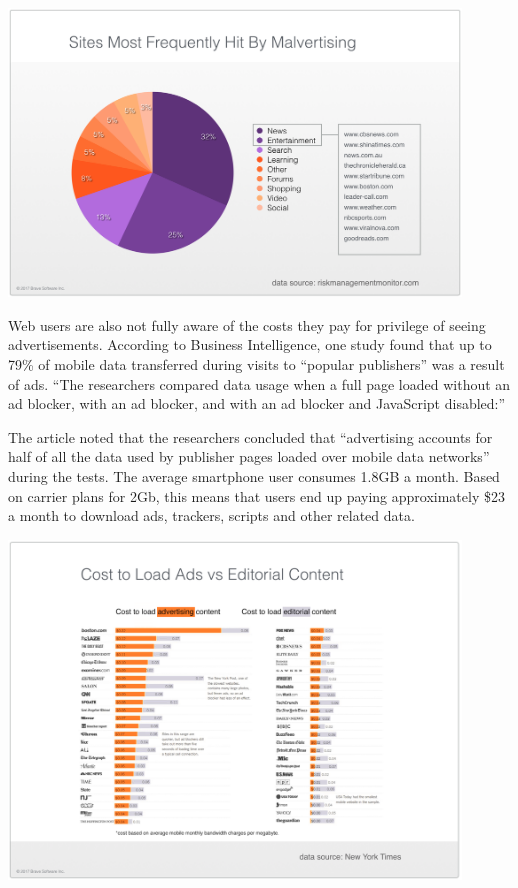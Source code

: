 \documentclass[11pt]{article}
\begin{document}
\begin{center}
\includegraphics[width=0.9\textwidth]{hitbymalvertising.png}
\end{center}

Web users are also not fully aware of the costs they pay for privilege of seeing advertisements. According to Business Intelligence, one study found that up to 79\% of mobile data transferred during visits to “popular publishers” was a result of ads. “The researchers compared data usage when a full page loaded without an ad blocker, with an ad blocker, and with an ad blocker and JavaScript disabled:”


The article noted that the researchers concluded that “advertising accounts for half of all the data used by publisher pages loaded over mobile data networks” during the tests. The average smartphone user consumes 1.8GB a month. Based on carrier plans for 2Gb, this means that users end up paying approximately \$23 a month to download ads, trackers, scripts and other related data.\cite{9}

\begin{center}
\includegraphics[width=0.9\textwidth]{cost_to_load_ads.png}
\end{center}
\end{document}
